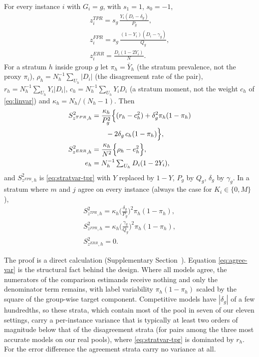 \begin{proposition}\label{prop:influence}
For every instance $i$ with $G_i=g$, with $s_1=1$, $s_0=-1$,
\begin{equation}\label{eq:infl-forms}
\begin{gathered}
z^{TPR}_i=s_g\,\frac{Y_i(D_i-\delta_g)}{P_g},\\
z^{FPR}_i=s_g\,\frac{(1-Y_i)(D_i-\gamma_g)}{Q_g},\\
z^{ERR}_i=\frac{D_i(1-2Y_i)}{N}.
\end{gathered}
\end{equation}
For a stratum $h$ inside group $g$ let $\pi_h=\bar Y_h$ (the stratum prevalence, not the proxy $\pi_i$), $\rho_h=N_h^{-1}\sum_{U_h}|D_i|$ (the disagreement rate of the pair),
$r_h=N_h^{-1}\sum_{U_h}Y_i|D_i|$, $c_h=N_h^{-1}\sum_{U_h}Y_iD_i$ (a stratum moment, not the weight $c_h$ of \eqref{eq:linvar}) and $\kappa_h=N_h/(N_h-1)$. Then
\begin{align}
S^2_{z^{TPR},h}&=\frac{\kappa_h}{P_g^2}\Big\{(r_h-c_h^2)+\delta_g^2\pi_h(1-\pi_h)\notag\\
&\qquad{}-2\delta_g\,c_h(1-\pi_h)\Big\},\label{eq:stratvar-tpr}\\
S^2_{z^{ERR},h}&=\frac{\kappa_h}{N^2}\Big\{\rho_h-e_h^2\Big\},\notag\\
e_h&=N_h^{-1}\textstyle\sum_{U_h}D_i(1-2Y_i),\label{eq:stratvar-err}
\end{align}
and $S^2_{z^{FPR},h}$ is \eqref{eq:stratvar-tpr} with $Y$ replaced by $1-Y$, $P_g$ by $Q_g$, $\delta_g$ by $\gamma_g$. In a stratum
where $m$ and $j$ agree on every instance (always the case for $K_i\in\{0,M\}$),
\begin{equation}\label{eq:agree-var}
\begin{gathered}
S^2_{z^{TPR},h}=\kappa_h\Big(\frac{\delta_g}{P_g}\Big)^2\pi_h(1-\pi_h),\\
S^2_{z^{FPR},h}=\kappa_h\Big(\frac{\gamma_g}{Q_g}\Big)^2\pi_h(1-\pi_h),\\
S^2_{z^{ERR},h}=0 .
\end{gathered}
\end{equation}
\end{proposition}

The proof is a direct calculation (Supplementary Section~). Equation \eqref{eq:agree-var} is the structural fact behind the
design. Where all models agree, the numerators of the comparison estimands receive nothing and only the denominator term remains, with label
variability $\pi_h(1-\pi_h)$ scaled by the square of the group-wise target component. Competitive models have $|\delta_g|$ of a few hundredths,
so these strata, which contain most of the pool in seven of our eleven settings, carry a per-instance variance that is typically at least two orders of magnitude below that of the disagreement strata (for pairs among the three most accurate models on our real pools),
where \eqref{eq:stratvar-tpr} is dominated by $r_h$. For the error difference the agreement strata carry no variance at all.

